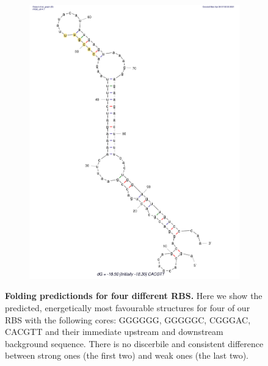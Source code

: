 \documentclass{scrartcl}[2013/05/29]%
\begin{document}
\begin{figure}[!ht]
\begin{subfigure}[b]{0.49\textwidth}
        \includegraphics[scale=0.25]{plots/Supplementary/Structure_CACGTT.pdf}
        \label{fig:CACGTT}
    \end{subfigure}
       \caption{\textbf{Folding predictionds for four different RBS.} Here we show the predicted, energetically most favourable structures for four of our RBS with the following cores: GGGGGG, GGGGGC, CGGGAC, CACGTT and their immediate upstream and downstream background sequence. There is no discerbile and consistent difference between strong ones (the first two) and weak ones (the last two).}
       \label{fig:structures}
\end{figure}
\end{document}
